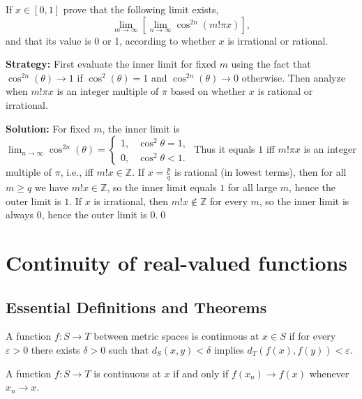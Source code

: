 \begin{problembox}
If \( x \in [0, 1] \) prove that the following limit exists,
\[\lim_{m \to \infty} \left[ \lim_{n \to \infty} \cos^{2n} (m! \pi x) \right],\]
and that its value is 0 or 1, according to whether \( x \) is irrational or rational.
\end{problembox}

\noindent\textbf{Strategy:} First evaluate the inner limit for fixed $m$ using the fact that $\cos^{2n}(\theta) \to 1$ if $\cos^2(\theta) = 1$ and $\cos^{2n}(\theta) \to 0$ otherwise. Then analyze when $m!\pi x$ is an integer multiple of $\pi$ based on whether $x$ is rational or irrational.

\bigskip\noindent\textbf{Solution:}
For fixed $m$, the inner limit is $\lim_{n\to\infty}\cos^{2n}(\theta)=\begin{cases}1,& \cos^2\theta=1,\\ 0,& \cos^2\theta<1.\end{cases}$ Thus it equals $1$ iff $m!\pi x$ is an integer multiple of $\pi$, i.e., iff $m!x\in\mathbb{Z}$. If $x=\tfrac{p}{q}$ is rational (in lowest terms), then for all $m\ge q$ we have $m!x\in\mathbb{Z}$, so the inner limit equals $1$ for all large $m$, hence the outer limit is $1$. If $x$ is irrational, then $m!x\notin\mathbb{Z}$ for every $m$, so the inner limit is always $0$, hence the outer limit is $0$.\qed

\section{Continuity of real-valued functions}

\subsection*{Essential Definitions and Theorems}

\begin{definition}
A function $f: S \to T$ between metric spaces is continuous at $x \in S$ if for every $\varepsilon > 0$ there exists $\delta > 0$ such that $d_S(x,y) < \delta$ implies $d_T(f(x), f(y)) < \varepsilon$.
\end{definition}

\begin{theorem}
A function $f: S \to T$ is continuous at $x$ if and only if $f(x_n) \to f(x)$ whenever $x_n \to x$.
\end{theorem}


